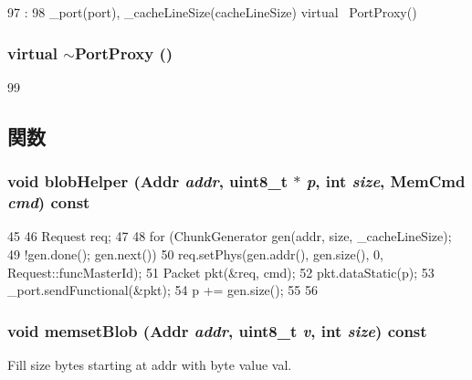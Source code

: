 \begin{DoxyCode}
97                                                             :
98         _port(port), _cacheLineSize(cacheLineSize) { }
    virtual ~PortProxy() { }
\end{DoxyCode}
\hypertarget{classPortProxy_a6c560a846e834d2c908fb390eecf420d}{
\subsubsection[{$\sim$PortProxy}]{\setlength{\rightskip}{0pt plus 5cm}virtual $\sim${\bf PortProxy} ()}}
\label{classPortProxy_a6c560a846e834d2c908fb390eecf420d}



\begin{DoxyCode}
99 { }
\end{DoxyCode}


\subsection{関数}
\hypertarget{classPortProxy_af1e843344eae366925dc9e05757a901d}{
\subsubsection[{blobHelper}]{\setlength{\rightskip}{0pt plus 5cm}void blobHelper ({\bf Addr} {\em addr}, \/  uint8\_\-t $\ast$ {\em p}, \/  int {\em size}, \/  {\bf MemCmd} {\em cmd}) const}}
\label{classPortProxy_af1e843344eae366925dc9e05757a901d}



\begin{DoxyCode}
45 {
46     Request req;
47 
48     for (ChunkGenerator gen(addr, size, _cacheLineSize);
49          !gen.done(); gen.next()) {
50         req.setPhys(gen.addr(), gen.size(), 0, Request::funcMasterId);
51         Packet pkt(&req, cmd);
52         pkt.dataStatic(p);
53         _port.sendFunctional(&pkt);
54         p += gen.size();
55     }
56 }
\end{DoxyCode}
\hypertarget{classPortProxy_ad68c64ee0acd471129b53bbfd59a2f9a}{
\subsubsection[{memsetBlob}]{\setlength{\rightskip}{0pt plus 5cm}void memsetBlob ({\bf Addr} {\em addr}, \/  uint8\_\-t {\em v}, \/  int {\em size}) const}}
\label{classPortProxy_ad68c64ee0acd471129b53bbfd59a2f9a}
Fill size bytes starting at addr with byte value val. 

